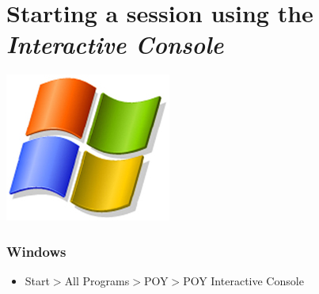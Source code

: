 \section{Starting a \poy session using the \emph{Interactive Console}}

\begin{flushleft}
	\begin{minipage}[c]{0.075\textwidth}
	   	\includegraphics[width=\textwidth]{figures/figLogoWindows.jpg}
	\end{minipage}%
	\quad
	\begin{minipage}[t]{0.89\textwidth}
		\subsubsection{Windows}
	\end{minipage}
			\begin{itemize}
                \item{Start$>$All Programs$>$POY$>$POY Interactive Console}
			\end{itemize}


\end{flushleft}
